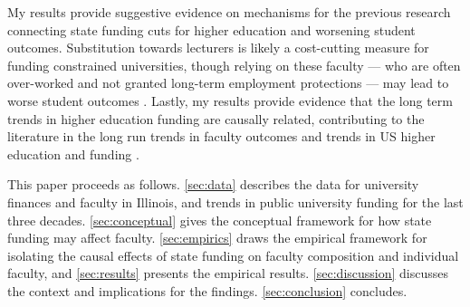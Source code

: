 My results provide suggestive evidence on mechanisms for the previous research connecting state funding cuts for higher education and worsening student outcomes.
Substitution towards lecturers is likely a cost-cutting measure for funding constrained universities, though relying on these faculty --- who are often over-worked and not granted long-term employment protections --- may lead to worse student outcomes \citep{ehrenberg2005tenured,zhu2021limited,jaeger2011examining}.
Lastly, my results provide evidence that the long term trends in higher education funding are causally related, contributing to the literature in the long run trends in faculty outcomes \citep{ehrenberg2003studying} and trends in US higher education and funding \citep{hoxby2009changing}.

This paper proceeds as follows.
\autoref{sec:data} describes the data for university finances and faculty in Illinois, and trends in public university funding for the last three decades.
\autoref{sec:conceptual} gives the conceptual framework for how state funding may affect faculty.
\autoref{sec:empirics} draws the empirical framework for isolating the causal effects of state funding on faculty composition and individual faculty, and \autoref{sec:results} presents the empirical results.
\autoref{sec:discussion} discusses the context and implications for the findings.
\autoref{sec:conclusion} concludes.
